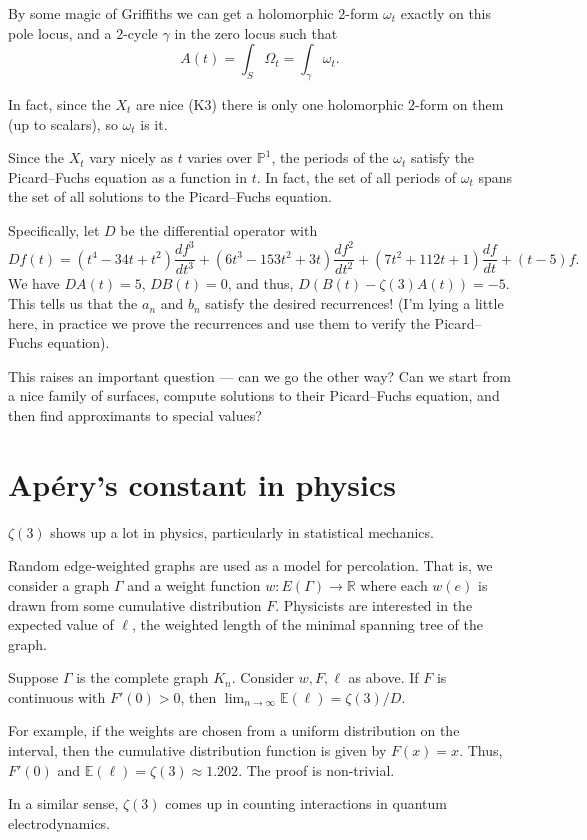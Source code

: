 \documentclass[12 pt, letterpaper]{amsart}
\begin{document}
By some magic of Griffiths \cite{griffiths-1969} we can get a holomorphic $2$-form $\omega_{t}$ exactly on this pole locus, and a $2$-cycle $\gamma$ in the zero locus such that
\[
	A(t) = \int_{S} \Omega_{t} = \int_{\gamma} \omega_{t}.
\]

In fact, since the $X_{t}$ are nice (K3) there is only one holomorphic $2$-form on them (up to scalars), so $\omega_{t}$ is it.

Since the $X_{t}$ vary nicely as $t$ varies over $\mathbb{P}^{1}$, the periods of the $\omega_{t}$ satisfy the Picard--Fuchs equation as a function in $t$. In fact, the set of all periods of $\omega_{t}$ spans the set of all solutions to the Picard--Fuchs equation.

Specifically, let $D$ be the differential operator with
\[
	Df(t) = (t^{4} - 34t + t^{2}) \frac{df^{3}}{dt^{3}} + (6t^{3} - 153t^{2} + 3t)\frac{df^{2}}{dt^{2}} + (7t^{2} + 112t + 1) \frac{d f}{d t} + (t - 5)f.
\]
We have $DA(t) = 5$, $DB(t) = 0$, and thus, $D(B(t) - \zeta(3)A(t)) = - 5$. This tells us that the $a_{n}$ and $b_{n}$ satisfy the desired recurrences! (I'm lying a little here, in practice we prove the recurrences and use them to verify the Picard--Fuchs equation).

This raises an important question --- can we go the other way? Can we start from a nice family of surfaces, compute solutions to their Picard--Fuchs equation, and then find approximants to special values?

\section{Ap\'ery's constant in physics}

$\zeta(3)$ shows up a lot in physics, particularly in statistical mechanics.

Random edge-weighted graphs are used as a model for percolation. That is, we consider a graph $\Gamma$ and a weight function $w : E(\Gamma) \to \mathbb{R}$ where each $w(e)$ is drawn from some cumulative distribution $F$. Physicists are interested in the expected value of $\ell$, the weighted length of the minimal spanning tree of the graph.

\begin{theorem}
	Suppose $\Gamma$ is the complete graph $K_{n}$. Consider $w, F, \ell$ as above. If $F$ is continuous with $F'(0) > 0$, then $\lim_{n \to \infty} \mathbb{E}(\ell) = \zeta(3) / D$.
\end{theorem}

For example, if the weights are chosen from a uniform distribution on the interval, then the cumulative distribution function is given by $F(x) = x$. Thus, $F'(0)$ and $\mathbb{E}(\ell) = \zeta(3) \approx 1.202$. The proof is non-trivial.

In a similar sense, $\zeta(3)$ comes up in counting interactions in quantum electrodynamics.



\end{document}
